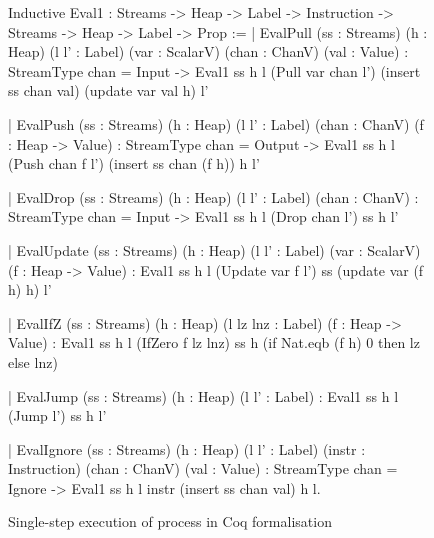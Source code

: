 \begin{figure}
\begin{coq}
Inductive Eval1 : Streams -> Heap -> Label -> Instruction
               -> Streams -> Heap -> Label -> Prop :=
  | EvalPull (ss : Streams) (h : Heap) (l l' : Label)
             (var : ScalarV) (chan : ChanV) (val : Value)
     : StreamType chan = Input
    -> Eval1        ss                           h  l (Pull var chan l')
            (insert ss chan val) (update var val h) l'

  | EvalPush (ss : Streams) (h : Heap) (l l' : Label) (chan : ChanV) (f : Heap -> Value)
     : StreamType chan = Output
    -> Eval1         ss             h l (Push chan f l')
             (insert ss chan (f h)) h l'

  | EvalDrop (ss : Streams) (h : Heap) (l l' : Label) (chan : ChanV)
     : StreamType chan = Input
    -> Eval1 ss h l (Drop chan l')
             ss h l'

  | EvalUpdate (ss : Streams) (h : Heap) (l l' : Label)
               (var : ScalarV) (f : Heap -> Value)
     : Eval1 ss                   h  l (Update var f l')
             ss (update var (f h) h) l'

  | EvalIfZ (ss : Streams) (h : Heap) (l lz lnz : Label) (f : Heap -> Value)
     : Eval1 ss h l (IfZero f lz lnz)
             ss h (if Nat.eqb (f h) 0 then lz else lnz)

  | EvalJump (ss : Streams) (h : Heap) (l l' : Label)
     : Eval1 ss h l (Jump l')
             ss h l'

  | EvalIgnore (ss : Streams) (h : Heap) (l l' : Label) (instr : Instruction)
              (chan : ChanV) (val : Value)
     : StreamType chan = Ignore
    -> Eval1         ss           h l instr
             (insert ss chan val) h l.
\end{coq}
\caption{Single-step execution of process in Coq formalisation}
\label{figs/coq/single-step}
\end{figure}

